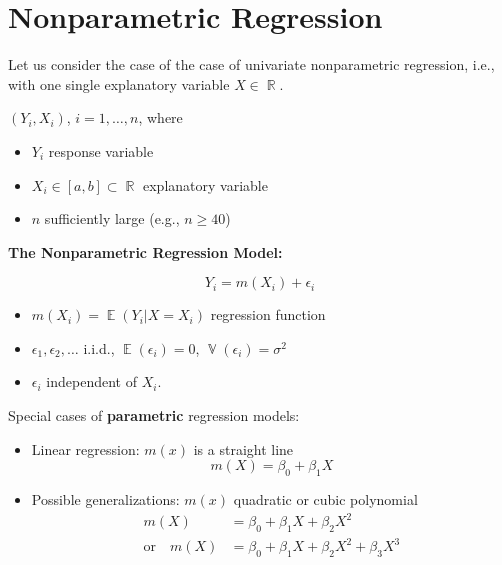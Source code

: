 \documentclass[14pt]{extreport}\usepackage[]{graphicx}\usepackage[]{xcolor}
\DeclareMathOperator{\E}{\mathbb{E}}
\DeclareMathOperator{\V}{\mathbb{V}}
\DeclareMathOperator{\R}{\mathbb{R}}
\begin{document}
 




\setcounter{section}{3}
\section{Nonparametric Regression}

Let us consider the case of the case of univariate nonparametric regression, i.e., with one single explanatory variable $X\in\R$.

\bigbreak{} $(Y_{i},X_{i})$, $i=1,\dots,n$, where
\begin{itemize}
\item $Y_{i}$ response variable
\item $X_{i}\in [a,b]\subset \R$ explanatory  variable
\item $n$ sufficiently large (e.g., $n\geq 40$)
\end{itemize}

\bigskip
\noindent 
\textbf{The Nonparametric Regression Model:}

\smallskip
$$Y_i=m(X_i)+\epsilon_i$$

\begin{itemize}
\item $m(X_i)=\E(Y_i|X=X_i)$ regression function
\item $\epsilon_1,\epsilon_2,\dots$ i.i.d., $\E(\epsilon_i)=0$, $\V(\epsilon_i)=\sigma^2$
\item $\epsilon_i$  independent of $X_i$.
\end{itemize}
\bigbreak
\bigskip

Special cases of \textbf{parametric}  regression models:

\begin{itemize}
\item Linear regression: $m(x)$ is a straight line
$$m(X)=\beta_0+\beta_1 X$$
\item Possible generalizations: $m(x)$ quadratic or cubic
polynomial
\begin{align*}
m(X)&=\beta_0 +\beta_1 X+\beta_2 X^2\\
\text{or} \quad m(X)&=\beta_0+\beta_1 X+\beta_2 X^2+\beta_3 X^3
\end{align*}

\end{itemize}
\end{document}
